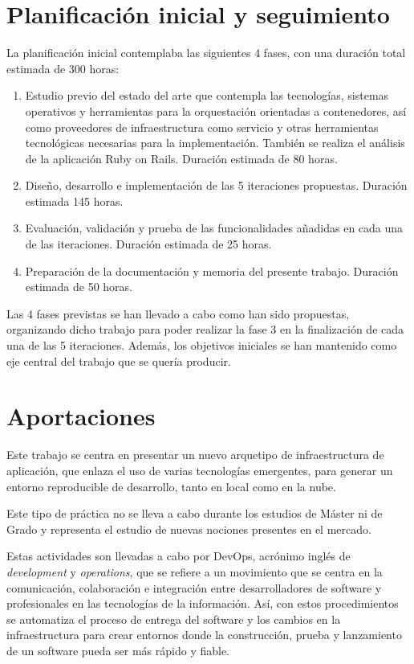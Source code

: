 \section{Planificación inicial y seguimiento}

La planificación inicial contemplaba las siguientes 4 fases, con una duración total estimada de 300 horas:
\begin{enumerate}
\item Estudio previo del estado del arte que contempla las tecnologías, sistemas operativos y herramientas para la orquestación orientadas a contenedores, así como proveedores de infraestructura como servicio y otras herramientas tecnológicas necesarias para la implementación. También se realiza el análisis de la aplicación Ruby on Rails. Duración estimada de 80 horas.
\item Diseño, desarrollo e implementación de las 5 iteraciones propuestas. Duración estimada 145 horas.
\item Evaluación, validación y prueba de las funcionalidades añadidas en cada una de las iteraciones. Duración estimada de 25 horas.
\item Preparación de la documentación y memoria del presente trabajo. Duración estimada de 50 horas.
\end{enumerate}

Las 4 fases previstas se han llevado a cabo como han sido propuestas, organizando dicho trabajo para poder realizar la fase 3 en la finalización de cada una de las 5 iteraciones. Además, los objetivos iniciales se han mantenido como eje central del trabajo que se quería producir.

\section{Aportaciones}

Este trabajo se centra en presentar un nuevo arquetipo de infraestructura de aplicación, que enlaza el uso de varias tecnologías emergentes, para generar un entorno reproducible de desarrollo, tanto en local como en la nube. 

Este tipo de práctica no se lleva a cabo durante los estudios de Máster ni de Grado y representa el estudio de nuevas nociones presentes en el mercado. 

Estas actividades son llevadas a cabo por DevOps, acrónimo inglés de \textit{development} y \textit{operations}, que se refiere a un movimiento que se centra en la comunicación, colaboración e integración entre desarrolladores de software y profesionales en las tecnologías de la información. Así, con estos procedimientos se automatiza el proceso de entrega del software y los cambios en la infraestructura para crear entornos donde la construcción, prueba y lanzamiento de un software pueda ser más rápido y fiable. 

